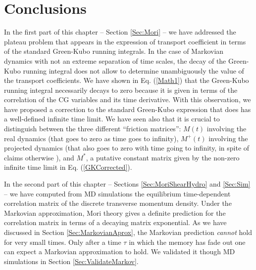 \documentclass[a4paper,openright,12pt]{book}
\begin{document}
\section{Conclusions}
\label{Sec:ConclusionsChapPBC}
In the first part of this chapter -- Section \ref{Sec:Mori} -- we have addressed  the plateau problem that  appears in
the  expression of  transport  coefficient in  terms  of the  standard
Green-Kubo running integrals.  In the  case of Markovian dynamics with
not an extreme separation of time  scales, the decay of the Green-Kubo
running integral does  not allow to determine  unambiguously the value
of the  transport coefficients.  We  have shown in  Eq.  (\ref{Math1})
that  the  Green-Kubo  running  integral necessarily  decays  to  zero
because it  is given in terms  of the correlation of  the CG variables
and its  time derivative.  With  this observation, we have  proposed a
correction  to  the  standard  Green-Kubo  expression  that  does  has  a
well-defined infinite time limit. We have seen also that it is crucial
to  distinguish between  the  three  different ``friction  matrices'':
$M(t)$ involving the real dynamics (that  goes to zero as time goes to
infinity), $M^+(t)$  involving the projected dynamics  (that also goes
to zero  with time  going to  infinity, in  spite of  claims otherwise
\cite{Kubo1991,Espanol1993}),  and $M^*$,  a putative  constant
matrix   given    by   the    non-zero   infinite   time    limit   in
Eq. (\ref{GKCorrected}).


In the second part of this chapter -- Sections \ref{Sec:MoriShearHydro} and \ref{Sec:Sim} --  we  have computed from  MD simulations  the equilibrium
time-dependent correlation matrix of  the discrete transverse momentum
density.   Under  the Markovian  approximation,  Mori  theory gives  a
definite prediction for the correlation  matrix in terms of a decaying
matrix exponential.   As we  have discussed in Section \ref{Sec:MarkovianAprox}, the  Markovian prediction
\textit{cannot}  hold for  very small  times. Only after a time $\tau$ in which the memory
has fade out one can expect a Markovian approximation to hold. We validated it though MD simulations in Section \ref{Sec:ValidateMarkov}.
\end{document}
